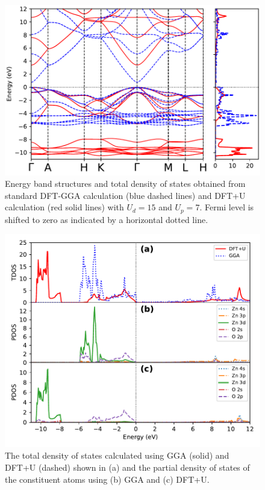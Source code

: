 \begin{figure}[tbh!]
	\centering
	\includegraphics[width=0.7\linewidth]{"images/rnd/band-dos_juxtapose"}
	\caption[Energy band structures and total density of states obtained from standard DFT-GGA calculation (blue dashed lines) and DFT+U calculation (red solid lines)with $U_d =15$ and $U_p= 7$]{Energy band structures and total density of states obtained from standard DFT-GGA calculation (blue dashed lines) and DFT+U calculation (red solid lines) with $U_d =15$ and $U_p= 7$. Fermi level is shifted to zero as indicated by a horizontal dotted line. }
	\label{fig:hubbard_band-dos}
\end{figure}


\begin{figure}[tbh!]
	\centering
	\includegraphics[width=0.7\linewidth]{"images/rnd/dos-pdos_juxtapose"}
	\caption[The total density of states calculated using GGA (solid) and DFT+U (dashed) shown in (a) and the partial density of states of the constituent atoms using (b) GGA and (c) DFT+U]{ The total density of states calculated using GGA (solid) and DFT+U (dashed) shown in (a) and the partial density of states of the constituent atoms using (b) GGA and (c) DFT+U.}
	\label{fig:hubbard_pdos}
\end{figure}

